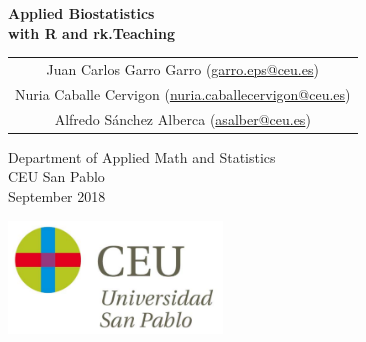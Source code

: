 \begin{titlepage}
\thispagestyle{empty}
\vspace*{7cm}
\par

\begin{center}
\normalfont\fontsize{30}{30}\selectfont
{\bfseries \color{blueceu}Applied Biostatistics\\ with R and rk.Teaching}
\end{center}
\vspace{1cm}

\begin{center}
\Large
\begin{tabular}{c}
Juan Carlos Garro Garro (\url{garro.eps@ceu.es})\\
Nuria Caballe Cervigon (\url{nuria.caballecervigon@ceu.es})\\
Alfredo Sánchez Alberca (\url{asalber@ceu.es})\\
\end{tabular}

\medskip 
Department of Applied Math and Statistics\\ CEU San Pablo\\[1cm]
\medskip 
September 2018

\vspace{1cm}
\includegraphics[height=3cm]{img/logo_uspceu}
\end{center}
\vfill
\end{titlepage}